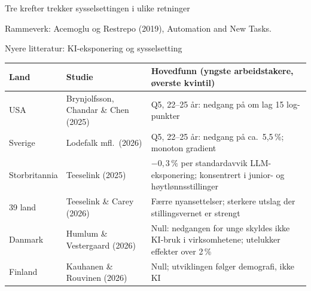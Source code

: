 \begin{frame}{Tre krefter trekker sysselsettingen i ulike retninger}
\vspace{0.3em}
\centering
{}

\vspace{0.5em}

\vspace{0.2em}
\raggedright\tiny\textcolor{illGray}{Rammeverk: Acemoglu og Restrepo (2019), Automation and New Tasks.}
\end{frame}

\begin{frame}{Nyere litteratur: KI-eksponering og sysselsetting}
\footnotesize
\setlength{\tabcolsep}{3pt}
\begin{tabular}{l l p{6.2cm}}
\toprule
Land & Studie & Hovedfunn (yngste arbeidstakere, øverste kvintil) \\
\midrule
USA            & Brynjolfsson, Chandar \& Chen (2025) & Q5, 22--25 år: nedgang på om lag 15 log-punkter \\
Sverige        & Lodefalk mfl.\ (2026)                & Q5, 22--25 år: nedgang på ca.\ 5,5\,\%; monoton gradient \\
Storbritannia  & Teeselink (2025)                     & $-0{,}3\,\%$ per standardavvik LLM-eksponering; konsentrert i junior- og høytlønnsstillinger \\
39 land        & Teeselink \& Carey (2026)            & Færre nyansettelser; sterkere utslag der stillingsvernet er strengt \\
Danmark        & Humlum \& Vestergaard (2026)         & Null: nedgangen for unge skyldes ikke KI-bruk i virksomhetene; utelukker effekter over 2\,\% \\
Finland        & Kauhanen \& Rouvinen (2026)          & Null; utviklingen følger demografi, ikke KI \\
\bottomrule
\end{tabular}

\vspace{0.8em}
\end{frame}


